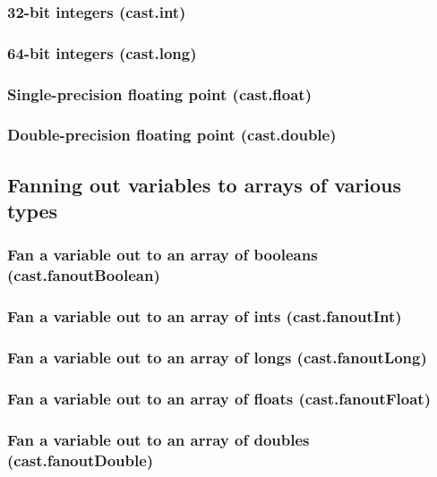 \documentclass{article}
\theoremstyle{definition}
\begin{document}
\subsubsection{32-bit integers (cast.int)}

\subsubsection{64-bit integers (cast.long)}

\subsubsection{Single-precision floating point (cast.float)}

\subsubsection{Double-precision floating point (cast.double)}

\subsection{Fanning out variables to arrays of various types}

\subsubsection{Fan a variable out to an array of booleans (cast.fanoutBoolean)}

\subsubsection{Fan a variable out to an array of ints (cast.fanoutInt)}

\subsubsection{Fan a variable out to an array of longs (cast.fanoutLong)}

\subsubsection{Fan a variable out to an array of floats (cast.fanoutFloat)}

\subsubsection{Fan a variable out to an array of doubles (cast.fanoutDouble)}
\end{document}
